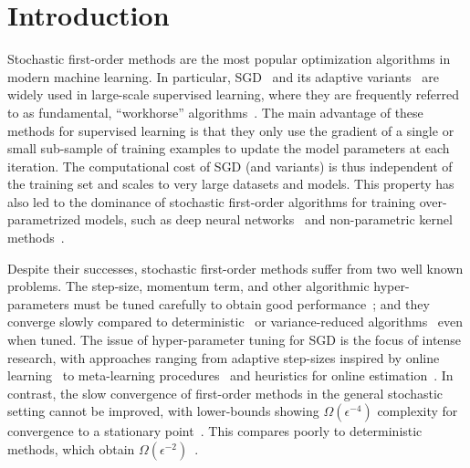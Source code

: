 
\chapter{Introduction}\label{ch:Introduction}


Stochastic first-order methods are the most popular optimization algorithms in modern machine learning.
In particular, \ac{SGD}~\citep{robbins1951sgd} and its adaptive variants~\citep{duchi2011adagrad, tieleman2012rmsprop, zeiler2012adadelta, kingma2015adam} are widely used in large-scale supervised learning, where they are frequently referred to as fundamental, ``workhorse'' algorithms~\citep{qian2019improvedrates, assran2019sgpush, grosse2015scaling}. 
The main advantage of these methods for supervised learning is that they only use the gradient of a single or small sub-sample of training examples to update the model parameters at each iteration.
The computational cost of \ac{SGD} (and variants) is thus independent of the training set and scales to very large datasets and models.
This property has also led to the dominance of stochastic first-order algorithms for training over-parametrized models, such as deep neural networks~\citep{zhang2017understanding, bengio2012practical} and non-parametric kernel methods~\citep{liang2018just, belkin2019datainterp}.

Despite their successes, stochastic first-order methods suffer from two well known problems. 
The step-size, momentum term, and other algorithmic hyper-parameters must be tuned carefully to obtain good performance~\citep{bengio2012practical, schaul2013no, li2019convergence, choi2019empirical}; and
they converge slowly compared to deterministic~\citep{nesterov2004lectures} or variance-reduced algorithms~\citep{schmidt2017sag, johnson2013svrg, defazio2014saga} even when tuned.
The issue of hyper-parameter tuning for \ac{SGD} is the focus of intense research, with approaches ranging from adaptive step-sizes inspired by online learning~\citep{luo2019adabound, li2019convergence, orabona2017coin} to meta-learning procedures~\citep{baydin2018hypergradient, schraudolph1999local, sutton1992gain, almeida1998parameter, plagianakos2001learning, shao2000rates} and heuristics for online estimation~\citep{schaul2013no, rolinek2018l4, tan2016bb}.
In contrast, the slow convergence of first-order methods in the general stochastic setting cannot be improved, with lower-bounds showing \( \Omega(\epsilon^{-4}) \) complexity for convergence to a stationary point~\citep{drori2019complexity, arjevani2019lower}.
This compares poorly to deterministic methods, which obtain \( \Omega(\epsilon^{-2}) \)~\citep{arjevani2016iteration}.


